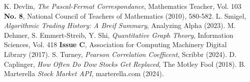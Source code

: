 \documentclass{article}
\begin{document}

\begin{thebibliography}{99}
    K. Devlin, \emph{The Pascal-Fermat Correspondance}, Mathematics Teacher, Vol. 103 \textbf{No. 8}, National Council of Teachers of Mathematics (2010), 580-582.
    L. Smigel, \emph{Algorithmic Trading History: A Breif Summary}, Analyzing Alpha (2023).
    M. Dehmer, S. Emmert-Streib, Y. Shi, \emph{Quantitative Graph Theory}, Information Sciences, Vol. 418 \textbf{Issue C}, Association for Computing Machinery Digital Library (2017).
    S. Turney, \emph{Pearson Correlation Coefficent}, Scribbr (2024).
    D. Caplinger, \emph{How Often Do Dow Stocks Get Replaced}, The Motley Fool (2018).
    B. Marterella \emph{Stock Market API}, marterella.com (2024).
\end{thebibliography}

\clearpage
\end{document}

